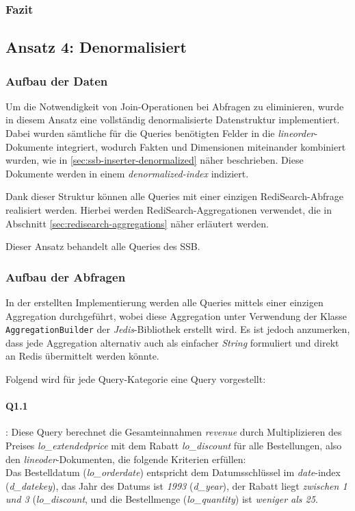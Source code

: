 \subsubsection{Fazit}


\subsection{Ansatz 4: Denormalisiert}

\subsubsection{Aufbau der Daten}
Um die Notwendigkeit von Join-Operationen bei Abfragen zu eliminieren, wurde in diesem Ansatz eine vollständig denormalisierte Datenstruktur implementiert. Dabei wurden sämtliche für die Queries benötigten Felder in die \emph{lineorder}-Dokumente integriert, wodurch Fakten und Dimensionen miteinander kombiniert wurden, wie in \cref{sec:ssb-inserter-denormalized} näher beschrieben. Diese Dokumente werden in einem \emph{denormalized-index} indiziert.

Dank dieser Struktur können alle Queries mit einer einzigen RediSearch-Abfrage realisiert werden. Hierbei werden RediSearch-Aggregationen verwendet, die in Abschnitt \ref{sec:redisearch-aggregations} näher erläutert werden.

Dieser Ansatz behandelt alle Queries des SSB.

\subsubsection{Aufbau der Abfragen}
In der erstellten Implementierung werden alle Queries mittels einer einzigen Aggregation durchgeführt, wobei diese Aggregation unter Verwendung der Klasse\\ \lstinline|AggregationBuilder| der \emph{Jedis}-Bibliothek erstellt wird.
Es ist jedoch anzumerken, dass jede Aggregation alternativ auch als einfacher \emph{String} formuliert und direkt an Redis übermittelt werden könnte.

Folgend wird für jede Query-Kategorie eine Query vorgestellt:

\paragraph{Q1.1}: Diese Query berechnet die Gesamteinnahmen \emph{revenue} durch Multiplizieren des Preises \emph{lo\_extendedprice} mit dem Rabatt \emph{lo\_discount} für alle Bestellungen, also den \emph{lineoder}-Dokumenten, die folgende Kriterien erfüllen:\\
Das Bestelldatum (\emph{lo\_orderdate}) entspricht dem Datumsschlüssel im \emph{date}-index\\
(\emph{d\_datekey}), das Jahr des Datums ist \emph{1993} (\emph{d\_year}), der Rabatt liegt \emph{zwischen 1 und 3} (\emph{lo\_discount}, und die Bestellmenge (\emph{lo\_quantity}) ist \emph{weniger als 25}. 

